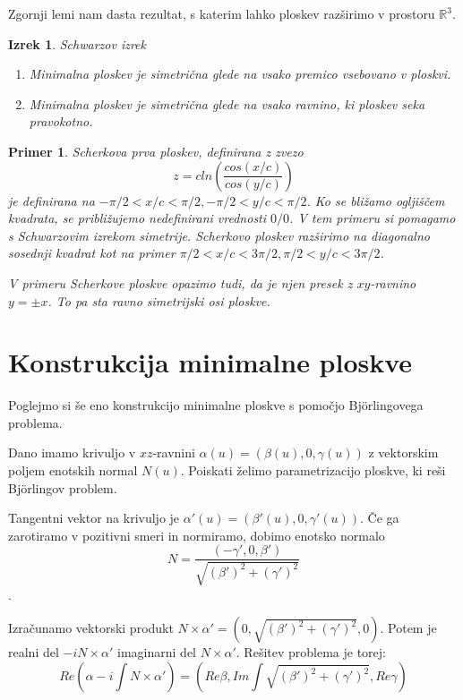 \documentclass{article}
\newtheorem{izrek}{Izrek}
\newtheorem{primer}{Primer}
\begin{document}
        Zgornji lemi nam dasta rezultat, s katerim lahko ploskev razširimo v prostoru $\mathbb{R}^3$.

        \begin{izrek}{Schwarzov izrek}
            \begin{enumerate}
                \item Minimalna ploskev je simetrična glede na vsako premico vsebovano v ploskvi.
                \item Minimalna ploskev je simetrična glede na vsako ravnino, ki ploskev seka pravokotno.
            \end{enumerate}
        \end{izrek}


        \begin{primer}
            Scherkova prva ploskev, definirana z zvezo $$ z = c ln \left( \frac{cos(x/c)}{cos(y/c)} \right) $$
            je definirana na $ -\pi / 2 < x / c < \pi / 2, -\pi / 2 < y / c < \pi / 2$. Ko se bližamo ogljiščem 
            kvadrata, se približujemo nedefinirani vrednosti $0 / 0$.
            V tem primeru si pomagamo s Schwarzovim izrekom simetrije. Scherkovo ploskev razširimo na diagonalno 
            sosednji kvadrat kot na primer $ \pi / 2 < x / c < 3 \pi / 2, \pi / 2 < y / c < 3 \pi / 2$.
        
            V primeru Scherkove ploskve opazimo tudi, da je njen presek z $xy$-ravnino $y = \pm x$. To pa sta ravno 
            simetrijski osi ploskve.
        \end{primer}


    \section{Konstrukcija minimalne ploskve}

        Poglejmo si še eno konstrukcijo minimalne ploskve s pomočjo Björlingovega problema.


        Dano imamo krivuljo v $xz$-ravnini $\alpha (u) = \left( \beta (u), 0, \gamma (u) \right)$ z vektorskim 
        poljem enotskih normal $N (u)$. Poiskati želimo parametrizacijo ploskve, ki reši Björlingov problem.

        Tangentni vektor na krivuljo je $\alpha' (u) = \left( \beta' (u), 0, \gamma' (u) \right)$. Če ga zarotiramo
        v pozitivni smeri in normiramo, dobimo enotsko normalo 
        $$N = \frac{ \left( - \gamma', 0, \beta' \right) }{ \sqrt{(\beta')^2 + (\gamma')^2 }} $$.

        Izračunamo vektorski produkt $N \times \alpha' = \left( 0, \sqrt{(\beta')^2 + (\gamma')^2}, 0 \right)$. 
        Potem je realni del $- i N \times \alpha'$ imaginarni del $N \times \alpha'$. Rešitev problema je torej:
        $$ Re \left( \alpha - i \int N \times \alpha' \right) = \left( Re \beta, Im \int \sqrt{(\beta')^2 + (\gamma')^2}, Re \gamma \right)$$
\end{document}
